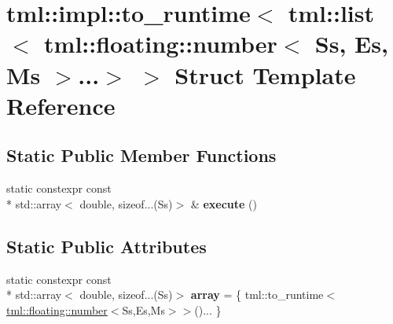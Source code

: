 \hypertarget{structtml_1_1impl_1_1to__runtime_3_01tml_1_1list_3_01tml_1_1floating_1_1number_3_01_ss_00_01_es_00_01_ms_01_4_8_8_8_4_01_4}{\section{tml\+:\+:impl\+:\+:to\+\_\+runtime$<$ tml\+:\+:list$<$ tml\+:\+:floating\+:\+:number$<$ Ss, Es, Ms $>$...$>$ $>$ Struct Template Reference}
\label{structtml_1_1impl_1_1to__runtime_3_01tml_1_1list_3_01tml_1_1floating_1_1number_3_01_ss_00_01_es_00_01_ms_01_4_8_8_8_4_01_4}
}
\subsection*{Static Public Member Functions}
\begin{DoxyCompactItemize}
\item 
\hypertarget{structtml_1_1impl_1_1to__runtime_3_01tml_1_1list_3_01tml_1_1floating_1_1number_3_01_ss_00_01_es_00_01_ms_01_4_8_8_8_4_01_4_a7af777bb366d0fff6037f770a3bfda12}{static constexpr const \\*
std\+::array$<$ double, sizeof...(Ss)$>$ \& {\bfseries execute} ()}\label{structtml_1_1impl_1_1to__runtime_3_01tml_1_1list_3_01tml_1_1floating_1_1number_3_01_ss_00_01_es_00_01_ms_01_4_8_8_8_4_01_4_a7af777bb366d0fff6037f770a3bfda12}

\end{DoxyCompactItemize}
\subsection*{Static Public Attributes}
\begin{DoxyCompactItemize}
\item 
\hypertarget{structtml_1_1impl_1_1to__runtime_3_01tml_1_1list_3_01tml_1_1floating_1_1number_3_01_ss_00_01_es_00_01_ms_01_4_8_8_8_4_01_4_ab451478f5f1f92ee112ce164dd269abf}{static constexpr const \\*
std\+::array$<$ double, sizeof...(Ss)$>$ {\bfseries array} = \{ tml\+::to\+\_\+runtime$<$\hyperlink{structtml_1_1floating_1_1number}{tml\+::floating\+::number}$<$Ss,Es,Ms$>$$>$()... \}}\label{structtml_1_1impl_1_1to__runtime_3_01tml_1_1list_3_01tml_1_1floating_1_1number_3_01_ss_00_01_es_00_01_ms_01_4_8_8_8_4_01_4_ab451478f5f1f92ee112ce164dd269abf}

\end{DoxyCompactItemize}


